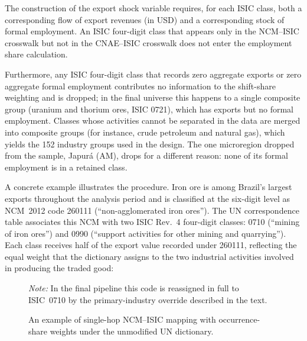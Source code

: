 \documentclass[
	11pt,				%
	oneside,			%
	a4paper,			%
	english,			%
	english				%
	]{abntex2ppgsi}
\theoremstyle{plain}
\theoremstyle{remark}
\theoremstyle{plain}%
\theoremstyle{remark}%
\begin{document}
\begin{apendicesenv}
The construction of the export shock variable requires, for each ISIC class,
both a corresponding flow of export revenues (in USD) and a corresponding stock of formal
employment. An ISIC four-digit class that appears only in the NCM--ISIC
crosswalk but not in the CNAE--ISIC crosswalk does not
enter the employment share calculation.

Furthermore, any ISIC four-digit class that records zero aggregate exports or zero aggregate formal employment contributes no information to the shift-share weighting and is dropped; in the final universe this happens to a single composite group (uranium and thorium ores, ISIC 0721), which has exports but no formal employment. Classes whose activities cannot be separated in the data are merged into composite groups (for instance, crude petroleum and natural gas), which yields the 152 industry groups used in the design. The one microregion dropped from the sample, Japurá (AM), drops for a different reason: none of its formal employment is in a retained class.


A concrete example illustrates the procedure. Iron ore is among Brazil's
largest exports throughout the analysis period and is classified at the
six-digit level as NCM~2012 code 260111 (``non-agglomerated iron ores''). The
UN correspondence table associates this NCM with two ISIC Rev.~4 four-digit
classes: 0710 (``mining of iron ores'') and 0990 (``support activities for
other mining and quarrying''). Each class receives half of the export value
recorded under 260111, reflecting the equal weight that the dictionary assigns
to the two industrial activities involved in producing the traded good:

\begin{figure}[ht]
\centering
\caption{An example of single-hop NCM--ISIC mapping with occurrence-share weights
   under the unmodified UN dictionary.}
\par\noindent\footnotesize \textit{Note:} 
   In the final pipeline this code is reassigned in full to ISIC~0710 by
   the primary-industry override described in the text.
\label{fig:crosswalk_example}
\end{figure}



\end{apendicesenv}
\end{document}
